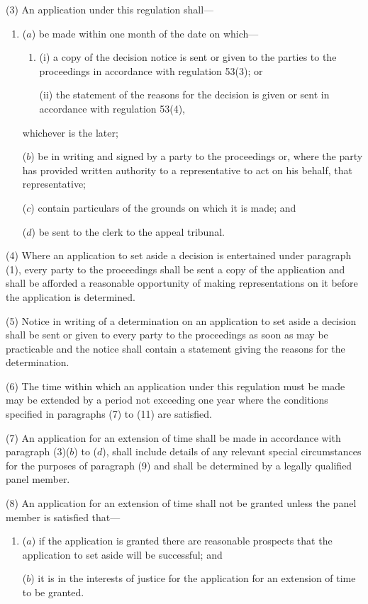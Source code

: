 \documentclass[12pt,a4paper]{article}
\begin{document}
(3) An application under this regulation shall—
\begin{enumerate}\item[]
($a$) be made within one month of the date on which—
\begin{enumerate}\item[]
(i) a copy of the decision notice is sent or given to the parties to the proceedings in accordance with regulation 53(3); or

(ii) the statement of the reasons for the decision is given or sent in accordance with regulation 53(4),
\end{enumerate}
whichever is the later;

($b$) be in writing and signed by a party to the proceedings or, where the party has provided written authority to a representative to act on his behalf, that representative;

($c$) contain particulars of the grounds on which it is made; and

($d$) be sent to the clerk to the appeal tribunal.
\end{enumerate}

(4) Where an application to set aside a decision is entertained under paragraph (1), every party to the proceedings shall be sent a copy of the application and shall be afforded a reasonable opportunity of making representations on it before the application is determined.

(5) Notice in writing of a determination on an application to set aside a decision shall be sent or given to every party to the proceedings as soon as may be practicable and the notice shall contain a statement giving the reasons for the determination.

(6) The time within which an application under this regulation must be made may be extended by a period not exceeding one year where the conditions specified in paragraphs (7) to (11) are satisfied.

(7) An application for an extension of time shall be made in accordance with paragraph (3)($b$)  to ($d$), shall include details of any relevant special circumstances for the purposes of paragraph (9) and shall be determined by a legally qualified panel member.

(8) An application for an extension of time shall not be granted unless the panel member is satisfied that—
\begin{enumerate}\item[]
($a$) if the application is granted there are reasonable prospects that the application to set aside will be successful; and

($b$) it is in the interests of justice for the application for an extension of time to be granted.
\end{enumerate}
\end{document}
